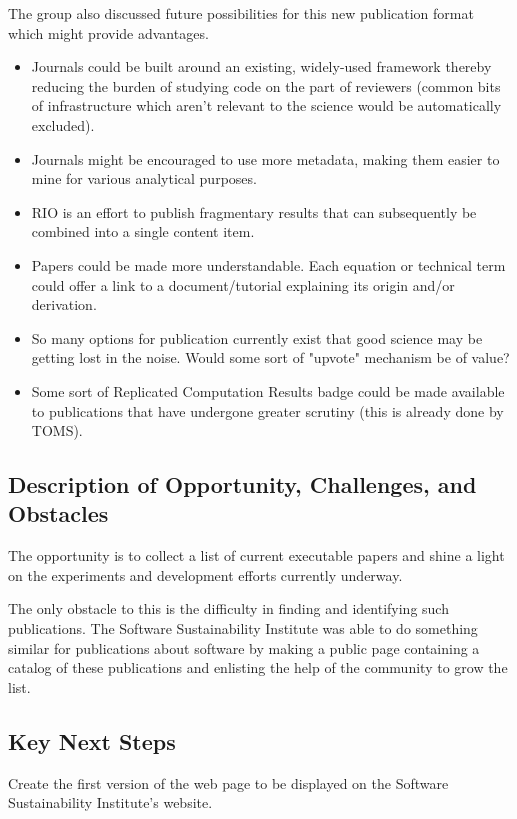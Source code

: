 The group also discussed future possibilities for this new publication format which might
provide advantages.

\begin{itemize}
\item Journals could be built around an existing, widely-used framework thereby reducing
  the burden of studying code on the part of reviewers (common bits of infrastructure
  which aren't relevant to the science would be automatically excluded).
\item Journals might be encouraged to use more metadata, making them easier to mine
  for various analytical purposes.
\item RIO is an effort to publish fragmentary results that can subsequently be combined
  into a single content item.
\item Papers could be made more understandable. Each equation or technical term could
  offer a link to a document/tutorial explaining its origin and/or derivation.
\item So many options for publication currently exist that good science may be getting
  lost in the noise. Would some sort of "upvote" mechanism be of value?
\item Some sort of Replicated Computation Results badge could be made available to
  publications that have undergone greater scrutiny (this is already done by TOMS).
\end{itemize}

\subsection{Description of Opportunity, Challenges, and Obstacles}

The opportunity is to collect a list of current executable papers and
shine a light on the experiments and development efforts currently underway.

The only obstacle to this is the difficulty in finding and identifying such
publications. The Software Sustainability Institute was able to do something similar
for publications about software by making a public page containing a catalog
of these publications and enlisting the help of the community to grow the list.

\subsection{Key Next Steps}

Create the first version of the web page to be displayed on the Software Sustainability
Institute's website.

